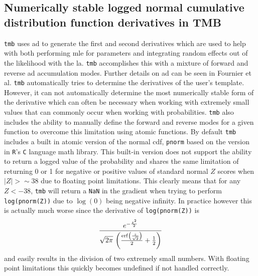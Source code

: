 \documentclass[11pt]{article}\usepackage[]{graphicx}\usepackage[]{color}
\begin{document}
\begin{appendices}
\section{Numerically stable logged normal cumulative distribution function derivatives in TMB}\label{astable1}
\texttt{\acrshort{tmb}} uses \acrfull{ad} to generate the first and second derivatives which are used to help with both performing \acrshort{mle} for parameters and integrating random effects out of the likelihood with the \acrfull{la}. \texttt{\acrshort{tmb}} accomplishes this with a mixture of forward and reverse \acrshort{ad} accumulation modes. Further details on \acrshort{ad} can be seen in Fournier et al\cite{Fournier_2012}. \texttt{\acrshort{tmb}} automatically tries to determine the derivatives of the user's template. However, it can not automatically determine the most numerically stable form of the derivative which can often be necessary when working with extremely small values that can commonly occur when working with probabilities. \texttt{\acrshort{tmb}} also includes the ability to manually define the forward and reverse modes for a given function to overcome this limitation using atomic functions. By default \texttt{\acrshort{tmb}} includes a built in atomic version of the normal \acrshort{cdf}, \texttt{pnorm} based on the version in \texttt{R}'s \texttt{C} language math library. This built-in version does not support the ability to return a logged value of the probability and shares the same limitation of returning 0 or 1 for negative or positive values of standard normal $Z$ scores when $|Z| > \sim 38$ due to floating point limitations. This clearly means that for any $Z < -38$, \texttt{\acrshort{tmb}} will return a \texttt{NaN} in the gradient when trying to perform \texttt{log(pnorm(Z))} due to $\log(0)$ being negative infinity. In practice however this is actually much worse since the derivative of \texttt{log(pnorm(Z))} is 
\begin{equation}\label{derlNCDF}
	{{e^ {- {{z^2}\over{2}} }}\over{\sqrt{2\pi}\,\left({{
 \mathrm{erf}\left({{z}\over{\sqrt{2}}}\right)}\over{2}}+{{1}\over{2
 }}\right)}}
\end{equation}
and easily results in the division of two extremely small numbers. With floating point limitations this quickly becomes undefined if not handled correctly. 


\end{appendices}
\end{document}
